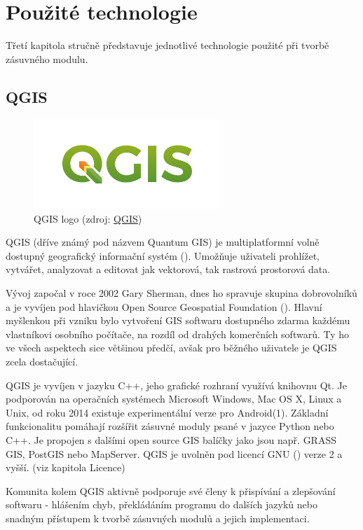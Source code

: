 \chapter{Použité technologie}
\label{3-technologie}

Třetí kapitola stručně představuje jednotlivé technologie použité při tvorbě zásuvného modulu.

\section{QGIS}

\begin{figure}[H]
    \centering
      \includegraphics[width=200pt]{./pictures/qgis-logo.png}
      \caption[QGIS logo]{QGIS logo 
      (zdroj: \href{https://www.qgis.org/en/_downloads/qgis-logo.png}{QGIS})}
      \label{fig:qgis}
  \end{figure}

QGIS (dříve známý pod názvem Quantum GIS) je multiplatformní volně dostupný geografický informační systém (). Umožňuje uživateli prohlížet, vytvářet, analyzovat a editovat jak vektorová, tak rastrová prostorová data.

Vývoj započal v roce 2002 Gary Sherman, dnes ho spravuje skupina dobrovolníků a je vyvíjen pod hlavičkou Open Source Geospatial Foundation (). Hlavní myšlenkou při vzniku bylo vytvoření GIS softwaru dostupného zdarma každému vlastníkovi osobního počítače, na rozdíl od drahých komerčních softwarů. Ty ho ve všech aspektech sice většinou předčí, avšak pro běžného uživatele je QGIS zcela dostačující.

QGIS je vyvíjen v jazyku C++, jeho grafické rozhraní využívá knihovnu Qt. Je podporován na operačních systémech Microsoft Windows, Mac OS X, Linux a Unix, od roku 2014 existuje experimentální verze pro Android(1). Základní funkcionalitu pomáhají rozšířit zásuvné moduly psané v jazyce Python nebo C++. Je propojen s dalšími open source GIS balíčky jako jsou např. GRASS GIS, PostGIS nebo MapServer. QGIS je uvolněn pod licencí GNU () verze 2 a vyšší. (viz kapitola Licence) 

Komunita kolem QGIS aktivně podporuje své členy k přispívání a zlepšování softwaru - hlášením chyb, překládáním programu do dalších jazyků nebo snadným přístupem k tvorbě zásuvných modulů a jejich implementaci. 


